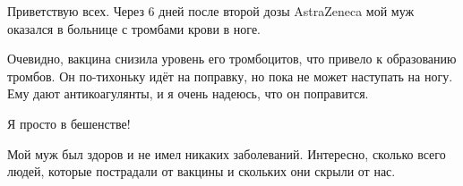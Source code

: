Приветствую всех. Через 6 дней после второй дозы AstraZeneca мой муж оказался в
больнице с тромбами крови в ноге.

Очевидно, вакцина снизила уровень его тромбоцитов, что привело к образованию
тромбов. Он по-тихоньку идёт на поправку, но пока не может наступать на
ногу. Ему дают антикоагулянты, и я очень надеюсь, что он поправится.

Я просто в бешенстве!

Мой муж был здоров и не имел никаких заболеваний. Интересно, сколько всего
людей, которые пострадали от вакцины и скольких они скрыли от нас.

